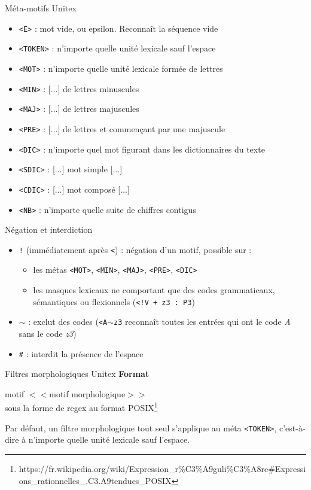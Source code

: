 \documentclass[xetex,xcolor={table,usenames,dvipsnames}]{beamer}
\newcommand{\bolder}[1]{{\color{purple}\bfseries#1}}
\begin{document}
\begin{frame}{Méta-motifs Unitex}
	\begin{itemize}
		\item \texttt{<E>} : mot vide, ou epsilon. Reconnaît la séquence vide
		\item \texttt{<TOKEN>} : n'importe quelle unité lexicale sauf l'espace
		\item \texttt{<MOT>} : n'importe quelle unité lexicale formée de lettres
		\item \texttt{<MIN>} : [$\dots$] de lettres minuscules
		\item \texttt{<MAJ>} : [$\dots$] de lettres majuscules
		\item \texttt{<PRE>} : [$\dots$] de lettres et commençant par une majuscule
		\item \texttt{<DIC>} : n'importe quel mot figurant dans les dictionnaires du texte
		\item \texttt{<SDIC>} : [$\dots$] mot simple [$\dots$]
		\item \texttt{<CDIC>} : [$\dots$] mot composé [$\dots$] 
		\item \texttt{<NB>} : n'importe quelle suite de chiffres contigus
	\end{itemize}
\end{frame}

\begin{frame}{Négation et interdiction}
	\begin{itemize}
		\item \texttt{!} (immédiatement après \texttt{<}) : négation d'un motif, possible sur :
		\begin{itemize}
			\item les métas \texttt{<MOT>}, \texttt{<MIN>}, \texttt{<MAJ>}, \texttt{<PRE>}, \texttt{<DIC>}
			\item les masques lexicaux ne comportant que des codes grammaticaux, sémantiques ou flexionnels (\texttt{<!V + z3 : P3})
		\end{itemize}
		\item \texttt{$\sim$} : exclut des codes (\texttt{<A$\sim$z3} reconnaît toutes les entrées qui ont le code \textit{A} sans le code \textit{z3})
		\item \texttt{\#} : interdit la présence de l'espace
	\end{itemize}
\end{frame}

\begin{frame}{Filtres morphologiques Unitex}
	\bolder{Format}
	
	motif $<<$motif morphologique$>>$\\
	sous la forme de regex au format \textsc{POSIX}\footnote{https://fr.wikipedia.org/wiki/Expression\_r\%C3\%A9guli\%C3\%A8re\#Expressions\_rationnelles\_.C3.A9tendues\_POSIX}
	
	Par défaut, un filtre morphologique tout seul s’applique au méta
	\texttt{<TOKEN>}, c’est-à-dire à n’importe quelle unité lexicale sauf l’espace.
\end{frame}
\end{document}
